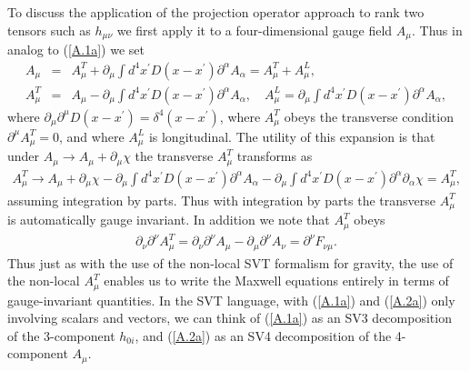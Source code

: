 \documentclass[aps,onecolumn,10pt]{revtex4}
\numberwithin{equation}{section}
\numberwithin{equation}{section}
\begin{document}
To discuss the application of the projection operator approach to rank two tensors such as $h_{\mu\nu}$ we first apply it to a four-dimensional gauge field $A_{\mu}$. Thus in analog to (\ref{A.1a}) we set
%
\begin{eqnarray}
A_{\mu}&=&A^T_{\mu}+\partial_{\mu}\int d^4x^{\prime}D(x-x^{\prime})\partial^{\alpha}A_{\alpha}=A^T_{\mu}+A^L_{\mu},
\nonumber\\
A^T_{\mu}&=&A_{\mu}-\partial_{\mu}\int d^4x^{\prime}D(x-x^{\prime})\partial^{\alpha}A_{\alpha},\quad A_{\mu}^L=\partial_{\mu}\int d^4x^{\prime}D(x-x^{\prime})\partial^{\alpha}A_{\alpha},
\label{A.2a}
\end{eqnarray}
%
where $\partial_{\mu}\partial^{\mu}D(x-x^{\prime})=\delta^4(x-x^{\prime})$, where $A^T_{\mu}$ obeys the transverse condition $\partial^{\mu}A^T_{\mu}=0$, and where $A_{\mu}^L$ is longitudinal. The utility of this expansion is that under  $A_{\mu}\rightarrow A_{\mu}+\partial_{\mu}\chi$ the transverse $A^T_{\mu}$ transforms as 
%
\begin{eqnarray}
A^T_{\mu}\rightarrow A_{\mu}+\partial_{\mu}\chi-\partial_{\mu}\int d^4x^{\prime}D(x-x^{\prime})\partial^{\alpha}A_{\alpha}
-\partial_{\mu}\int d^4x^{\prime}D(x-x^{\prime})\partial^{\alpha}\partial_{\alpha}\chi=A_{\mu}^T,
\label{A.3a}
\end{eqnarray}
%
assuming integration by parts. Thus with integration by parts the transverse $A^T_{\mu}$ is automatically gauge invariant. In addition we note that $A_{\mu}^T$ obeys 
%
\begin{eqnarray}
\partial_{\nu}\partial^{\nu}A^T_{\mu}=\partial_{\nu}\partial^{\nu}A_{\mu}-\partial_{\mu}\partial^{\nu}A_{\nu}=\partial^{\nu}F_{\nu\mu}.
\label{A.4a}
\end{eqnarray}
%
Thus just as with the use of the non-local SVT formalism for gravity, the use of the non-local $A_{\mu}^T$ enables us to write the Maxwell equations entirely in terms of gauge-invariant quantities. In the SVT language, with (\ref{A.1a}) and (\ref{A.2a}) only involving scalars and vectors, we can think of (\ref{A.1a}) as an SV3 decomposition of the 3-component $h_{0i}$, and (\ref{A.2a}) as an SV4 decomposition of the 4-component $A_{\mu}$.
\end{document}
